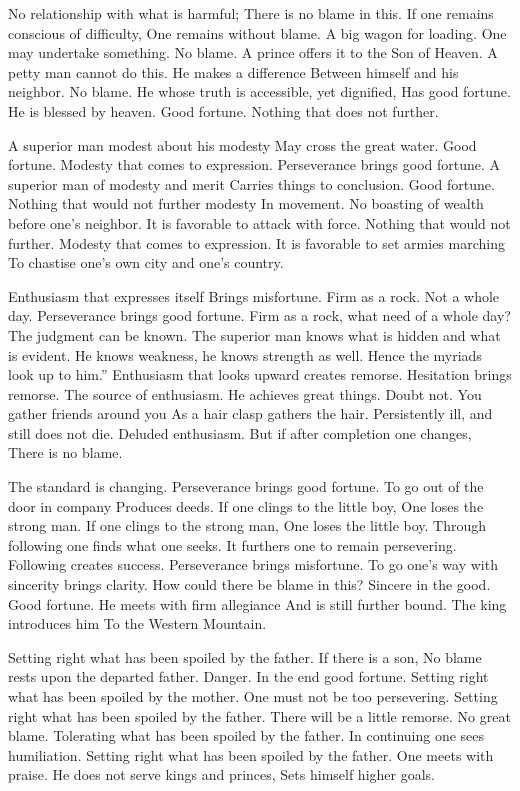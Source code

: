 {No relationship with what is harmful;
 There is no blame in this.
 If one remains conscious of difficulty,
 One remains without blame.}
{A big wagon for loading.
 One may undertake something.
 No blame.}
{A prince offers it to the Son of Heaven.
 A petty man cannot do this.}
{He makes a difference
 Between himself and his neighbor.
 No blame.}
{He whose truth is accessible, yet dignified,
 Has good fortune.}
{He is blessed by heaven.
 Good fortune.
 Nothing that does not further.}

{A superior man modest about his modesty
 May cross the great water.
 Good fortune.}
{Modesty that comes to expression.
 Perseverance brings good fortune.}
{A superior man of modesty and merit
 Carries things to conclusion.
 Good fortune.}
{Nothing that would not further modesty
 In movement.}
{No boasting of wealth before one’s neighbor.
 It is favorable to attack with force.
 Nothing that would not further.}
{Modesty that comes to expression.
 It is favorable to set armies marching
 To chastise one’s own city and one’s country.}

{Enthusiasm that expresses itself
 Brings misfortune.}
{Firm as a rock. Not a whole day.
 Perseverance brings good fortune.}
{Firm as a rock, what need of a whole day?
 The judgment can be known.
 The superior man knows what is hidden and what is evident.
 He knows weakness, he knows strength as well.
 Hence the myriads look up to him.”
 Enthusiasm that looks upward creates remorse.
 Hesitation brings remorse.}
{The source of enthusiasm.
 He achieves great things.
 Doubt not.
 You gather friends around you
 As a hair clasp gathers the hair.}
{Persistently ill, and still does not die.}
{Deluded enthusiasm.
 But if after completion one changes,
 There is no blame.}

{The standard is changing.
 Perseverance brings good fortune.
 To go out of the door in company
 Produces deeds.}
{If one clings to the little boy,
 One loses the strong man.}
{If one clings to the strong man,
 One loses the little boy.
 Through following one finds what one seeks.
 It furthers one to remain persevering.}
{Following creates success.
 Perseverance brings misfortune.
 To go one’s way with sincerity brings clarity.
 How could there be blame in this?}
{Sincere in the good. Good fortune.}
{He meets with firm allegiance
 And is still further bound.
 The king introduces him
 To the Western Mountain.}

{Setting right what has been spoiled by the father.
 If there is a son,
 No blame rests upon the departed father.
 Danger. In the end good fortune.}
{Setting right what has been spoiled by the mother.
 One must not be too persevering.}
{Setting right what has been spoiled by the father.
 There will be a little remorse. No great blame.}
{Tolerating what has been spoiled by the father.
 In continuing one sees humiliation.}
{Setting right what has been spoiled by the father.
 One meets with praise.}
{He does not serve kings and princes,
 Sets himself higher goals.}

